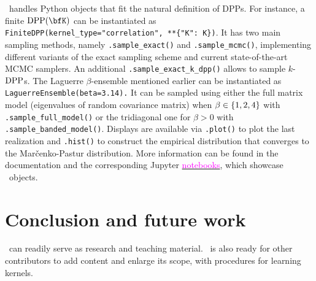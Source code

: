 \documentclass[twoside,11pt]{article}
\begin{document}
    \lstset{language=mypython}

    \DPPy\ handles Python objects that fit the natural definition of DPPs.
    For instance, a finite $\DPP(\bfK)$ can be instantiated as
    \lstinline!FiniteDPP(kernel_type="correlation", **{"K": K})!.
    It has two main sampling methods, namely
    \lstinline{.sample_exact()} and
    \lstinline{.sample_mcmc()},
    implementing different variants of the exact sampling scheme and current state-of-the-art MCMC samplers.
    An additional
    \lstinline{.sample_exact_k_dpp()}
    allows to sample $k$-$\operatorname{DPP}$s.
    The Laguerre $\beta$-ensemble mentioned earlier can be instantiated as
    \lstinline{LaguerreEnsemble(beta=3.14).}
    It can be sampled using either the full matrix model (eigenvalues of random covariance matrix) when $\beta\in\left\{ 1,2,4 \right\}$ with
    \lstinline{.sample_full_model()}
    or the tridiagonal one for $\beta > 0$ with
    \lstinline{.sample_banded_model()}.
    Displays are available via
    \lstinline{.plot()} to plot the last realization and
    \lstinline{.hist()} to construct the empirical distribution that converges to the Mar\v{c}enko-Pastur distribution.
    More information can be found in the documentation and the corresponding Jupyter \href{https://github.com/guilgautier/DPPy/tree/master/notebooks}{\textcolor{magenta}{notebooks}}, which showcase \DPPy\ objects.


\section{Conclusion and future work} %
\label{sec:conclusion_and_future_work}

    \DPPy\ can readily serve as research and teaching material.
    \DPPy\ is also ready for other contributors to add content and enlarge its scope, \eg with procedures for learning kernels.


\newpage

\end{document}
